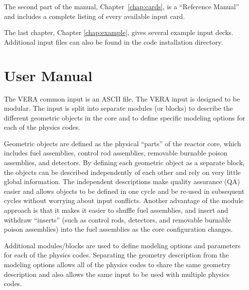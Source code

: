 \documentclass{report}
\numberwithin{equation}{section}
\begin{document}
The second part of the manual, Chapter~\ref{chap:cards}, is a ``Reference Manual'' and includes
a complete listing of every available input card.

The last chapter, Chapter \ref{chap:example}, gives several example input decks.  Additional input files can
also be found in the code installation directory.



\chapter{User Manual}
\label{chap:user}

The VERA common input is an ASCII file.
The VERA input is designed to be modular.  The input is split into separate modules
(or blocks) to describe the different geometric objects in the core and
to define specific modeling options for each of the physics codes.

Geometric objects are defined as the physical ``parts'' of the reactor core, which includes
fuel assemblies, control rod assemblies, removable burnable poison assemblies, and detectors.
By defining each geometric object as a separate block, the objects can be described
independently of each other and rely on very little global information.  The independent
descriptions make quality assurance (QA) easier and allows objects to be defined in one cycle
and be re-used in subsequent cycles without worrying about input conflicts.
Another advantage of the module approach is that it makes it easier to shuffle fuel assemblies,
and insert and withdraw ``inserts'' (such as control rods, detectors, and removable burnable
poison assemblies) into the fuel assemblies as the core configuration changes.

Additional modules/blocks are used to define modeling options and parameters for each of the physics
codes.  Separating the geometry description from the modeling options allows all of the
physics codes to share the same geometry description and also allows the same input to be
used with multiple physics codes.
\end{document}
